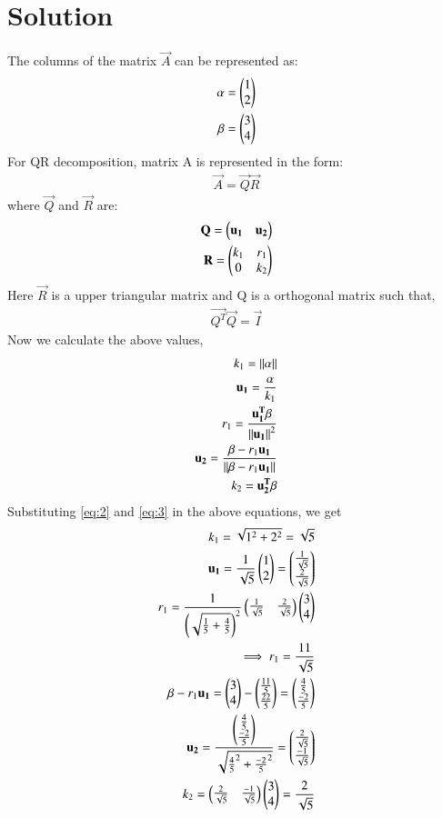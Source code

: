 \documentclass[journal,12pt,twocolumn]{IEEEtran}
\begin{document}
\section{Solution}
The columns of the matrix $\vec{A}$ can be represented as:
\begin{align}
\alpha=\begin{pmatrix}1\\2\end{pmatrix}\label{eq:2}\\
\beta=\begin{pmatrix}3\\4\end{pmatrix}\label{eq:3}
\end{align}
For QR decomposition, matrix A is represented in the form:
\begin{align}
    \Vec{A}=\vec{Q}\vec{R}
\end{align}
where $\vec{Q}$ and $\Vec{R}$ are:
\begin{align}
    \vec{Q}=\myvec{\Vec{u_1} & \vec{u_2}}\label{eq:4}\\
    \vec{R}=\myvec{k_1 & r_1 \\ 0 & k_2}\label{eq:5}
\end{align}
Here $\vec{R}$ is a upper triangular matrix and Q is a orthogonal matrix such that,
\begin{align}
\vec{Q^T}\vec{Q}=\vec{I}
\end{align}
Now we calculate the above values,
\begin{align}
k_1 = \norm{\alpha}\\
\vec{u_1}=\frac{\alpha}{k_1}\\
r_1 = \frac{\vec{u_1^T}\beta}{\norm{\Vec{u_1}}^2}\\
\vec{u_2}=\frac{\beta-r_1\vec{u_1}}{\norm{\beta-r_1\vec{u_1}}}\\
k_2 = \vec{u_2^T}\beta
\end{align}
Substituting \eqref{eq:2} and \eqref{eq:3} in the above equations, we get
\begin{align}
k_1= \sqrt{1^2+2^2}= \sqrt{5}\\
\vec{u_1}= \frac{1}{\sqrt{5}}\myvec{1\\2}=\myvec{\frac{1}{\sqrt{5}}\\\frac{2}{\sqrt{5}}}\\
r_1=\frac{1}{\brak{\sqrt{\frac{1}{5}+\frac{4}{5}}}^2}\myvec{\frac{1}{\sqrt{5}}&\frac{2}{\sqrt{5}}}\myvec{3\\4}\\
\implies r_1= \frac{11}{\sqrt{5}}\\
\beta-r_1\vec{u_1}=\myvec{3\\4}-\myvec{\frac{11}{5}\\\frac{22}{5}}=\myvec{\frac{4}{5}\\\frac{-2}{5}}\\
\Vec{u_2}=\frac{\myvec{\frac{4}{5}\\\frac{-2}{5}}}{\sqrt{{\frac{4}{5}}^2+{\frac{-2}{5}}^2}}=\myvec{\frac{2}{\sqrt{5}}\\\frac{-1}{\sqrt{5}}}\\
k_2 = \myvec{\frac{2}{\sqrt{5}}&\frac{-1}{\sqrt{5}}}\myvec{3\\4}= \frac{2}{\sqrt{5}}
\end{align}
\end{document}
